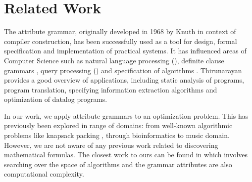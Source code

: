 \section{Related Work} \label{relatedwork}

The attribute grammar, originally developed in 1968 by Knuth \cite{knuth1968semantics} in context of compiler
construction, has been successfully used as a tool for design, formal specification
and implementation of practical systems. It has influenced areas of
Computer Science such as natural language processing (\citealp{hafiz2011modular, starkie2002inferring}), 
definite clause grammars \cite{bratko2001prolog}, query processing (\citealp{koch2007attribute,ramakrishnan1991top}) and specification of algorithms \cite{bellanova1984examples}.
Thirunarayan \cite{thirunarayan2009attribute} provides a good overview of 
applications, including static analysis of programs, program translation, specifying information
extraction algorithms and optimization of datalog programs.

In our work, we apply attribute grammars to an optimization problem. This has previously been explored in range of domains: from well-known algorithmic problems 
like knapsack packing \cite{o2004solving}, through bioinformatics \cite{waldispuhl2002approximate} to music domain\cite{desainte1994using}.
However, we are not aware of any previous work related to discovering mathematical formulas. The closest work to ours can be found in \cite{cheung1999attribute} which involves searching
over the space of algorithms and the grammar attributes are also computational complexity.



